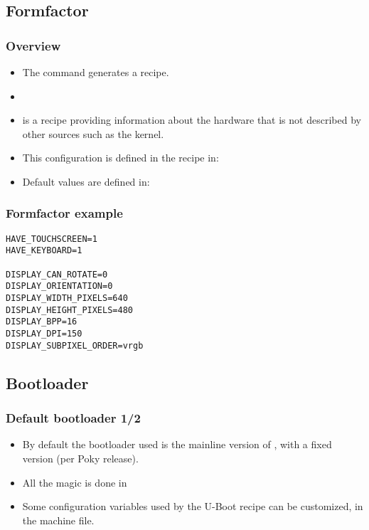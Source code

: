 \subsection{Formfactor}

\begin{frame}
  \frametitle{Overview}
  \begin{itemize}
    \item The  command generates a  recipe.
    \item {}
    \item {} is a recipe providing information
      about the hardware that is not described by other sources such
      as the kernel.
    \item This configuration is defined in the recipe in:
    \item Default values are defined in:
  \end{itemize}
\end{frame}

\begin{frame}[fragile]
  \frametitle{Formfactor example}
  \begin{block}{}
    \begin{verbatim}
HAVE_TOUCHSCREEN=1
HAVE_KEYBOARD=1

DISPLAY_CAN_ROTATE=0
DISPLAY_ORIENTATION=0
DISPLAY_WIDTH_PIXELS=640
DISPLAY_HEIGHT_PIXELS=480
DISPLAY_BPP=16
DISPLAY_DPI=150
DISPLAY_SUBPIXEL_ORDER=vrgb 
    \end{verbatim}
  \end{block}
\end{frame}

\subsection{Bootloader}

\begin{frame}
  \frametitle{Default bootloader 1/2}
  \begin{itemize}
    \item By default the bootloader used is the mainline version of
      , with a fixed version (per Poky release).
    \item All the magic is done in
    \item Some configuration variables used by the U-Boot recipe can
      be customized, in the machine file.
  \end{itemize}
\end{frame}

